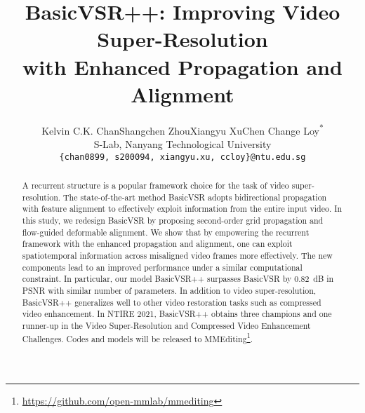 \documentclass[10pt,twocolumn,letterpaper]{article}
\begin{document}
\title{BasicVSR++: Improving Video Super-Resolution\\with Enhanced Propagation and Alignment}

\author{Kelvin C.K. Chan\qquad Shangchen Zhou\qquad  Xiangyu Xu\qquad Chen Change Loy\textsuperscript{*}\\
S-Lab, Nanyang Technological University\\
{\tt\small \{chan0899, s200094, xiangyu.xu, ccloy\}@ntu.edu.sg}
}

\ificcvfinal\thispagestyle{empty}\fi
\thispagestyle{empty}

\begin{abstract}
    \vspace{-0.1cm}
A recurrent structure is a popular framework choice for the task of video super-resolution. The state-of-the-art method BasicVSR adopts bidirectional propagation with feature alignment to effectively exploit information from the entire input video.
In this study, we redesign BasicVSR by proposing second-order grid propagation and flow-guided deformable alignment. We show that by empowering the recurrent framework with the enhanced propagation and alignment, one can exploit spatiotemporal information across misaligned video frames more effectively.
The new components lead to an improved performance under a similar computational constraint.
In particular, our model BasicVSR++ surpasses BasicVSR by 0.82~dB in PSNR with similar number of parameters. In addition to video super-resolution, BasicVSR++ generalizes well to other video restoration tasks such as compressed video enhancement.
In NTIRE 2021, BasicVSR++ obtains three champions and one runner-up in the Video Super-Resolution and Compressed Video Enhancement Challenges. Codes and models will be released to MMEditing\footnote{\url{https://github.com/open-mmlab/mmediting}}.
\end{abstract}
\end{document}
